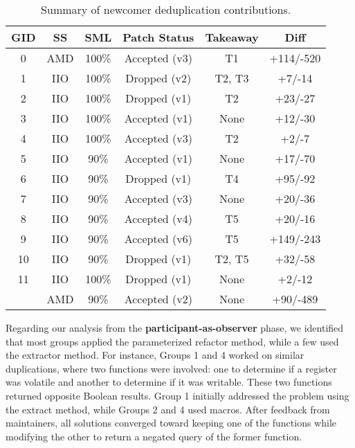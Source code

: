 \documentclass[10pt,conference]{IEEEtran}
\begin{document}
\begin{table}[ht]
\centering
\caption{Summary of newcomer deduplication contributions.}
\begin{tabular}{ |c |c |c |c |c | c| }
\hline
\textbf{GID} & \textbf{SS} & \textbf{SML} & \textbf{Patch Status} & \textbf{Takeaway} & \textbf{Diff} \\
\hline
0 & AMD & 100\% & Accepted (v3) & T1 & +114/-520 \\ \hline
1 & IIO & 100\% & Dropped (v2) & T2, T3 & +7/-14 \\ \hline
2 & IIO & 100\% & Dropped (v1) & T2 & +23/-27 \\ \hline
3 & IIO & 100\% & Accepted (v1) & None & +12/-30 \\ \hline
4 & IIO & 100\% & Accepted (v3) & T2 & +2/-7 \\ \hline
5 & IIO & 90\% & Accepted (v1) & None & +17/-70 \\ \hline
6 & IIO & 90\% & Dropped (v1) & T4 & +95/-92 \\ \hline
7 & IIO & 90\% & Accepted (v3) & None & +20/-36 \\ \hline
8 & IIO & 90\% & Accepted (v4) & T5 & +20/-16 \\ \hline
9 & IIO & 90\% & Accepted (v6) & T5 & +149/-243 \\ \hline
10 & IIO & 90\% & Dropped (v1) & T2, T5 & +32/-58 \\ \hline
11 & IIO & 100\% & Dropped (v1) & None & +2/-12 \\
   & AMD & 90\% & Accepted (v2) & None & +90/-489 \\ \hline

\end{tabular}%

\label{tab:stu}
\end{table}

Regarding our analysis from the \textbf{participant-as-observer} phase, we identified that most groups applied the parameterized refactor method, while a few used the extractor method. For instance, Groups 1 and 4 worked on similar duplications, where two functions were involved: one to determine if a register was volatile and another to determine if it was writable. These two functions returned opposite Boolean results. Group 1 initially addressed the problem using the extract method, while Groups 2 and 4 used macros. After feedback from maintainers, all solutions converged toward keeping one of the functions while modifying the other to return a negated query of the former function.
\end{document}
